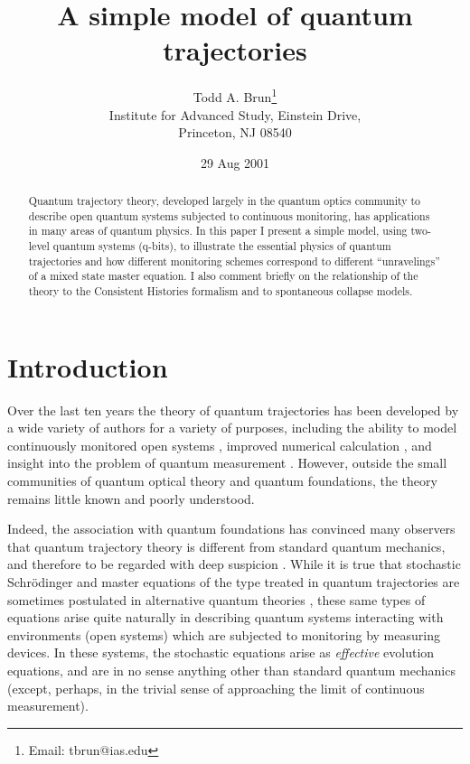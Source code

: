 \documentclass[12pt]{article}
\date{29 Aug 2001}
\begin{document}
\title{A simple model of quantum trajectories}

\author{Todd A. Brun\thanks{Email:  tbrun@ias.edu} \\
Institute for Advanced Study, Einstein Drive, \\
Princeton, NJ  08540 }

\maketitle

\begin{abstract}
Quantum trajectory theory, developed largely in the quantum optics
community to describe open quantum systems subjected to continuous
monitoring, has applications in many areas of quantum physics.
In this paper I present a simple model, using two-level quantum
systems (q-bits), to illustrate the essential physics of quantum
trajectories and how different monitoring schemes correspond to different
``unravelings'' of a mixed state master equation.
I also comment briefly on the relationship of the
theory to the Consistent Histories formalism and to spontaneous collapse
models.
\end{abstract}

\section{Introduction}

Over the last ten years the theory of quantum trajectories has been
developed by a wide variety of authors
\cite{Carmichael,Dalibard,Dum,Gardiner,Gisin1,Diosi,Gisin2,Schack}
for a variety of purposes,
including the ability to model continuously monitored open systems
\cite{Carmichael,Dum,Gardiner}, improved numerical calculation
\cite{Dalibard,Schack}, and insight into the problem
of quantum measurement \cite{Gisin1,Diosi,Gisin2}.
However, outside the small communities of quantum optical
theory and quantum foundations, the theory remains little known and
poorly understood.

Indeed, the association with quantum foundations has convinced many
observers that quantum trajectory theory is different from
standard quantum mechanics, and therefore to be regarded with deep
suspicion \cite{Zeh}.  While it is true that stochastic Schr\"odinger
and master equations of the type treated in quantum trajectories
are sometimes postulated in alternative quantum theories
\cite{Pearle,GRW,Percival2,Penrose},
these same types of equations arise quite naturally in describing
quantum systems interacting with environments (open systems)
which are subjected to monitoring by measuring devices.  In these
systems, the stochastic equations arise as {\it effective} evolution
equations, and are in no sense anything other than standard quantum
mechanics (except, perhaps, in the trivial sense of approaching the
limit of continuous measurement).
\end{document}

